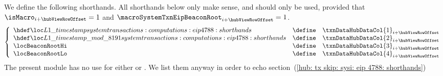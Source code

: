 We define the following shorthands.
All shorthands below only make sense, and should only be used, provided that
$\isMacro                     _{i + \hubViewRowOffset} = 1$ and
$\macroSystemTxnEipBeaconRoot _{i + \hubViewRowOffset} = 1$.
\[
	\left\{ \begin{array}{lcl}
		\locLayerOneTimeStamp             & \define & \txnDataHubDataCol {1} _{i + \hubViewRowOffset} \\
		\locLayerOneTimeStampModuloPrime  & \define & \txnDataHubDataCol {2} _{i + \hubViewRowOffset} \\
		\locBeaconRootHi                  & \define & \txnDataHubDataCol {3} _{i + \hubViewRowOffset} \\
		\locBeaconRootLo                  & \define & \txnDataHubDataCol {4} _{i + \hubViewRowOffset} \\
	\end{array} \right.
\]
\saNote{}
The present module has no use for either
\locBeaconRootHi{} or
\locBeaconRootLo{}.
We list them anyway in order to echo
section~(\ref{hub: tx skip: sysi: eip 4788: shorthands})
